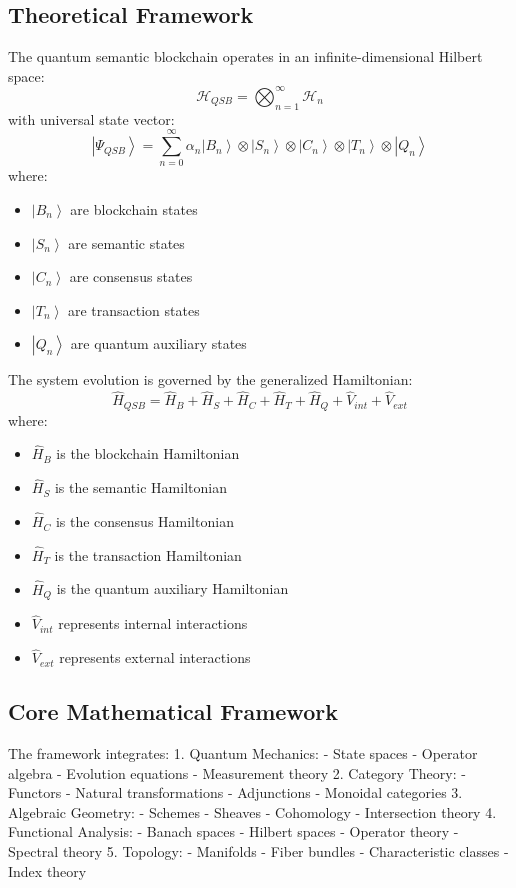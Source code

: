 \documentclass[12pt]{article}
\newcommand{\ket}[1]{\left|#1\right\rangle}
\newcommand{\op}[1]{\hat{#1}}
\begin{document}
\subsection{Theoretical Framework}
The quantum semantic blockchain operates in an infinite-dimensional Hilbert space:
\begin{equation}
\mathcal{H}_{QSB} = \bigotimes_{n=1}^{\infty} \mathcal{H}_n
\end{equation}
with universal state vector:
\begin{equation}
\ket{\Psi_{QSB}} = \sum_{n=0}^{\infty} \alpha_n\ket{B_n} \otimes \ket{S_n} \otimes \ket{C_n} \otimes \ket{T_n} \otimes \ket{Q_n}
\end{equation}
where:
\begin{itemize}
\item $\ket{B_n}$ are blockchain states
\item $\ket{S_n}$ are semantic states
\item $\ket{C_n}$ are consensus states
\item $\ket{T_n}$ are transaction states
\item $\ket{Q_n}$ are quantum auxiliary states
\end{itemize}
The system evolution is governed by the generalized Hamiltonian:
\begin{equation}
\op{H}_{QSB} = \op{H}_B + \op{H}_S + \op{H}_C + \op{H}_T + \op{H}_Q + \op{V}_{int} + \op{V}_{ext}
\end{equation}
where:
\begin{itemize}
\item $\op{H}_B$ is the blockchain Hamiltonian
\item $\op{H}_S$ is the semantic Hamiltonian
\item $\op{H}_C$ is the consensus Hamiltonian
\item $\op{H}_T$ is the transaction Hamiltonian
\item $\op{H}_Q$ is the quantum auxiliary Hamiltonian
\item $\op{V}_{int}$ represents internal interactions
\item $\op{V}_{ext}$ represents external interactions
\end{itemize}
\subsection{Core Mathematical Framework}
The framework integrates:
1. Quantum Mechanics:
- State spaces
- Operator algebra
- Evolution equations
- Measurement theory
2. Category Theory:
- Functors
- Natural transformations
- Adjunctions
- Monoidal categories
3. Algebraic Geometry:
- Schemes
- Sheaves
- Cohomology
- Intersection theory
4. Functional Analysis:
- Banach spaces
- Hilbert spaces
- Operator theory
- Spectral theory
5. Topology:
- Manifolds
- Fiber bundles
- Characteristic classes
- Index theory
\end{document}
